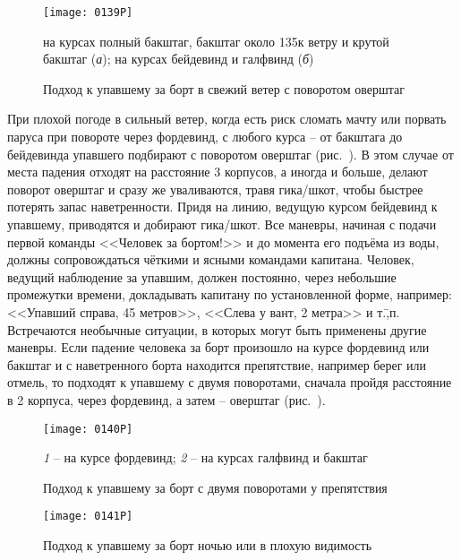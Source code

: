\begin{figure*}[h]
  \centering{}
  \texttt{[image: 0139P]}
  \caption{Подход к упавшему за борт в свежий ветер с поворотом оверштаг}
  \label{fig:139}
  \small
  \centering{}
  на курсах полный бакштаг, бакштаг около 135\gr к ветру и крутой бакштаг (\textit{а}); на курсах бейдевинд и галфвинд (\textit{б})
\end{figure*}

При плохой погоде в сильный ветер, когда есть риск сломать мачту или
порвать паруса при повороте через фордевинд, с любого курса \--- от
бакштага до бейдевинда упавшего подбирают с поворотом оверштаг
(рис.~). В этом случае от места падения отходят на расстояние
3 корпусов, а иногда и больше, делают поворот оверштаг и сразу
же уваливаются, травя гика\-/шкот, чтобы быстрее потерять запас
наветренности. Придя на линию, ведущую курсом бейдевинд к упавшему,
приводятся и добирают гика\-/шкот. Все маневры, начиная с подачи
первой команды <<Человек за бортом!>> и до момента его подъёма из
воды, должны сопровождаться чёткими и ясными командами
капитана. Человек, ведущий наблюдение за упавшим, должен постоянно,
через небольшие промежутки времени, докладывать капитану по
установленной форме, например: <<Упавший справа, 45 метров>>,
<<Слева у вант, 2 метра>> и т.\=,п. Встречаются необычные ситуации, в
которых могут быть применены другие маневры. Если падение человека за
борт произошло на курсе фордевинд или бакштаг и с наветренного борта
находится препятствие, например берег или отмель, то подходят к
упавшему с двумя поворотами, сначала пройдя расстояние в 2
корпуса, через фордевинд, а затем \--- оверштаг (рис.~).

\begin{figure}[h]
  \centering{}
  \texttt{[image: 0140P]}
  \caption{Подход к упавшему за борт с двумя поворотами у препятствия}
  \label{fig:140}
  \small
  \centering{}
  \textit{1} \--- на курсе фордевинд; \textit{2} \--- на курсах галфвинд и бакштаг
\end{figure}

\begin{figure}[h]
  \centering{}
  \texttt{[image: 0141P]}
  \caption{Подход к упавшему за борт ночью или в плохую видимость}
  \label{fig:141}
\end{figure}

